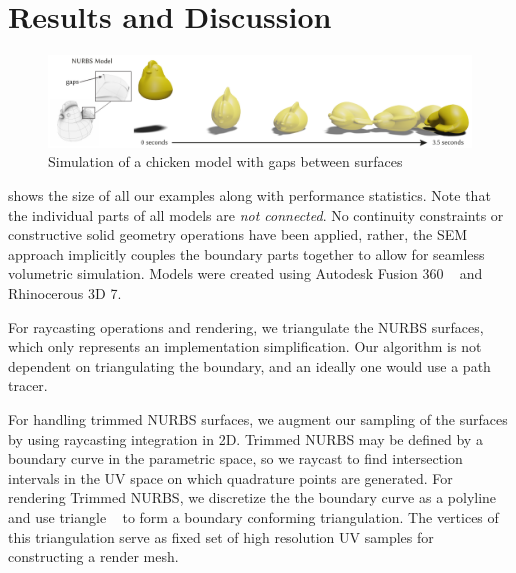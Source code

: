 %
\section{Results and Discussion}





\begin{figure}
  \includegraphics[width=\textwidth]{figures/chicken.pdf}
  \caption{Simulation of a chicken model with gaps between surfaces}
  \label{fig:chicken}
\end{figure}

 shows the size of all our examples along with performance statistics. 
Note that the individual parts of all models are \emph{not connected}.
No continuity constraints or constructive solid geometry operations have been applied, rather, the SEM approach implicitly couples the boundary parts together
to allow for seamless volumetric simulation. 
Models were created using Autodesk Fusion 360 ~ and Rhinocerous 3D 7.

For raycasting operations and rendering, we triangulate the NURBS surfaces, which only represents an implementation simplification. Our algorithm is not dependent on triangulating the boundary, and an ideally one would use a path tracer.


For handling trimmed NURBS surfaces, we augment our sampling of the surfaces by using raycasting integration in 2D. Trimmed NURBS may be defined by a boundary curve in the parametric space, so we raycast to find intersection intervals in the UV space on which quadrature points are generated. For rendering Trimmed NURBS, we discretize the the boundary curve as a polyline and use triangle ~ to form a boundary conforming triangulation. The vertices of this triangulation serve as fixed set of high resolution UV samples for constructing a render mesh.

